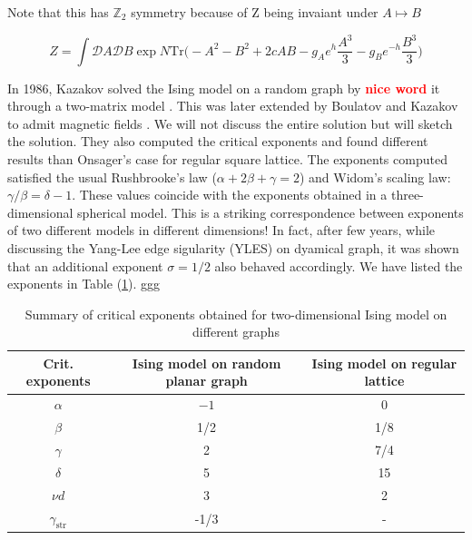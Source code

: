 \documentclass[11pt]{article}
\newcommand{\TODO}[1]{\textcolor{red}{{\bf #1}}}
\begin{document}
Note that this has $\mathbb{Z}_{2}$ symmetry because of 
Z being invaiant under $A \mapsto B$



\begin{equation}
	\label{eq:RIsing1} 
	Z = \int \mathcal{D}A \mathcal{D}B \exp N \mbox{Tr} \Bigg(-A^2 -B^2 + 2c AB -g_{A}e^{h} \frac{A^3}{3} 
	- g_{B}e^{-h} \frac{B^3}{3}  \Bigg)
\end{equation}

In 1986, Kazakov solved the Ising model on a random graph by \TODO{nice word} it through a two-matrix model \cite{Kazakov:1986hy}. This was later extended by Boulatov and Kazakov to admit magnetic fields \cite{Boulatov:1986sb}. We will not discuss the entire solution but will sketch the solution. They also computed the critical exponents and found different results than Onsager's case for regular square lattice. 
The exponents computed satisfied the usual Rushbrooke's law ($\alpha + 2\beta+\gamma=2$) and Widom's scaling law: $\gamma/\beta = \delta -1$. These values coincide with the  exponents obtained in a three-dimensional spherical model. This is a striking correspondence between exponents of two different models in different dimensions! In fact, after few years, while discussing the Yang-Lee edge sigularity (YLES) on dyamical graph, it was shown that an additional exponent $\sigma =1/2$ also behaved accordingly. We have listed the exponents in Table (\ref{table:crit_exp}). ggg


\vspace{10mm} 
\begin{table} 
	\begin{center} 
\begin{tabular}{|c|c|c|}
	\hline Crit. exponents & Ising model on random planar graph & Ising model on regular lattice \\
	\hline$\alpha$ & $-1$ & 0 \\
	$\beta$ & 1/2 & 1/8 \\
	$\gamma$ & 2 & 7/4 \\
	$\delta$ & 5 & 15 \\
	$\nu d$ & 3 & 2 \\
	$\gamma_{\text {str}}$ & -1/3 & - \\
	\hline
\end{tabular}
\end{center} 
	\caption{Summary of critical exponents obtained for two-dimensional Ising model on different graphs} 
	\label{table:crit_exp}
	\end{table} 
\end{document}

